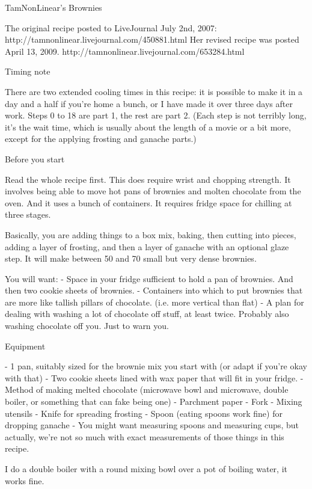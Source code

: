 TamNonLinear’s Brownies

The original recipe posted to LiveJournal July 2nd, 2007:
http://tamnonlinear.livejournal.com/450881.html
Her revised recipe was posted April 13, 2009.
http://tamnonlinear.livejournal.com/653284.html

Timing note

There are two extended cooling times in this recipe: it is possible to make it in a day and a half if you're home a bunch, or I have made it over three days after work. Steps 0 to 18 are part 1, the rest are part 2. (Each step is not terribly long, it's the wait time, which is usually about the length of a movie or a bit more, except for the applying frosting and ganache parts.)

Before you start

Read the whole recipe first. This does require wrist and chopping strength. It involves being able to move hot pans of brownies and molten chocolate from the oven. And it uses a bunch of containers. It requires fridge space for chilling at three stages.

Basically, you are adding things to a box mix, baking, then cutting into pieces, adding a layer of frosting, and then a layer of ganache with an optional glaze step. It will make between 50 and 70 small but very dense brownies.

You will want:
- Space in your fridge sufficient to hold a pan of brownies. And then two cookie sheets of brownies.
- Containers into which to put brownies that are more like tallish pillars of chocolate. (i.e. more vertical than flat)
- A plan for dealing with washing a lot of chocolate off stuff, at least twice. Probably also washing chocolate off you. Just to warn you.

Equipment

- 1 pan, suitably sized for the brownie mix you start with (or adapt if you're okay with that)
- Two cookie sheets lined with wax paper that will fit in your fridge.
- Method of making melted chocolate (microwave bowl and microwave, double boiler, or something that can fake being one)
- Parchment paper
- Fork
- Mixing utensils
- Knife for spreading frosting
- Spoon (eating spoons work fine) for dropping ganache
- You might want measuring spoons and measuring cups, but actually, we're not so much with exact measurements of those things in this recipe.

I do a double boiler with a round mixing bowl over a pot of boiling water, it works fine.


